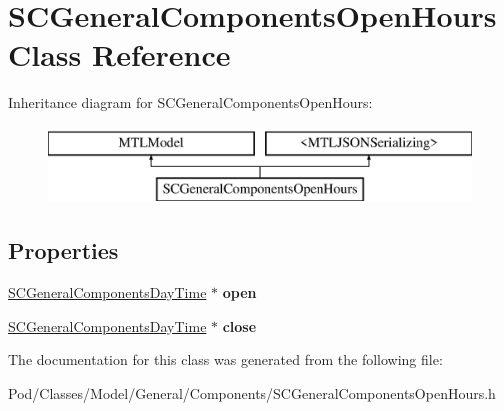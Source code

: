 \hypertarget{interface_s_c_general_components_open_hours}{}\section{S\+C\+General\+Components\+Open\+Hours Class Reference}
\label{interface_s_c_general_components_open_hours}
Inheritance diagram for S\+C\+General\+Components\+Open\+Hours\+:\begin{figure}[H]
\begin{center}
\leavevmode
\includegraphics[height=2.000000cm]{interface_s_c_general_components_open_hours}
\end{center}
\end{figure}
\subsection*{Properties}
\begin{DoxyCompactItemize}
\item 
\hyperlink{interface_s_c_general_components_day_time}{S\+C\+General\+Components\+Day\+Time} $\ast$ {\bfseries open}\hypertarget{interface_s_c_general_components_open_hours_a7cdda8de07da1991ab3fd341f6219393}{}\label{interface_s_c_general_components_open_hours_a7cdda8de07da1991ab3fd341f6219393}

\item 
\hyperlink{interface_s_c_general_components_day_time}{S\+C\+General\+Components\+Day\+Time} $\ast$ {\bfseries close}\hypertarget{interface_s_c_general_components_open_hours_a33554074aa197cc51778d52c7ccf96b7}{}\label{interface_s_c_general_components_open_hours_a33554074aa197cc51778d52c7ccf96b7}

\end{DoxyCompactItemize}


The documentation for this class was generated from the following file\+:\begin{DoxyCompactItemize}
\item 
Pod/\+Classes/\+Model/\+General/\+Components/S\+C\+General\+Components\+Open\+Hours.\+h\end{DoxyCompactItemize}
